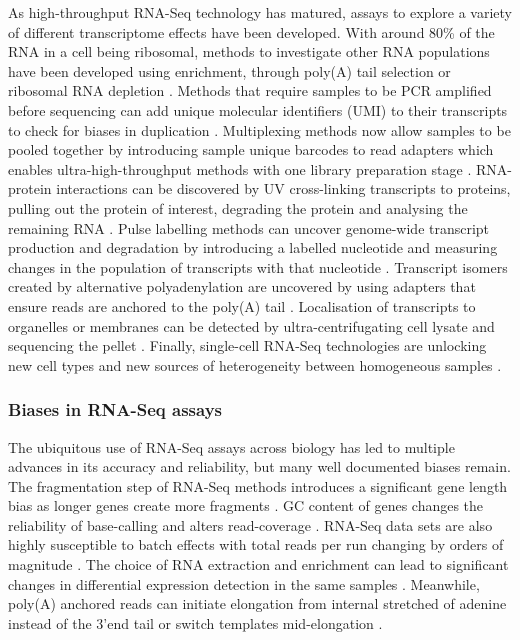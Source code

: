\documentclass[../main.tex]{subfiles}
\begin{document}
As high-throughput RNA-Seq technology has matured, assays to explore a variety of different transcriptome effects have been developed.
With around 80\% of the RNA in a cell being ribosomal, methods to investigate other RNA populations have been developed using enrichment, through poly(A) tail selection or ribosomal RNA depletion \parencite{Stark2019}. 
Methods that require samples to be PCR amplified before sequencing can add unique molecular identifiers (UMI) to their transcripts to check for biases in duplication \parencite{Kivioja2011}.
Multiplexing methods now allow samples to be pooled together by introducing sample unique barcodes to read adapters which enables ultra-high-throughput methods with one library preparation stage \parencite{Craig2008}.
RNA-protein interactions can be discovered by UV cross-linking transcripts to proteins, pulling out the protein of interest, degrading the protein and analysing the remaining RNA \parencite{Granneman2009}.
Pulse labelling methods can uncover genome-wide transcript production and degradation by introducing a labelled nucleotide and measuring changes in the population of transcripts with that nucleotide \parencite{Chan2018}.
Transcript isomers created by alternative polyadenylation are uncovered by using adapters that ensure reads are anchored to the poly(A) tail \parencite{Pelechano2013}. 
Localisation of transcripts to organelles or membranes can be detected by ultra-centrifugating cell lysate and sequencing the pellet \parencite{Iserman2020}.
Finally, single-cell RNA-Seq technologies are unlocking new cell types and new sources of heterogeneity between homogeneous samples \parencite{Jovic2022}.

\subsubsection{Biases in RNA-Seq assays}

The ubiquitous use of RNA-Seq assays across biology has led to multiple advances in its accuracy and reliability, but many well documented biases remain.
The fragmentation step of RNA-Seq methods introduces a significant gene length bias as longer genes create more fragments \parencite{Oshlack2009}.
GC content of genes changes the reliability of base-calling and alters read-coverage \parencite{Dohm2008}.
RNA-Seq data sets are also highly susceptible to batch effects with total reads per run changing by orders of magnitude \parencite{Auer2010}.
The choice of RNA extraction and enrichment can lead to significant changes in differential expression detection in the same samples \parencite{Sultan2014}.
Meanwhile, poly(A) anchored reads can initiate elongation from internal stretched of adenine instead of the 3'end tail or switch templates mid-elongation \parencite{Balazs2019}.
\end{document}
